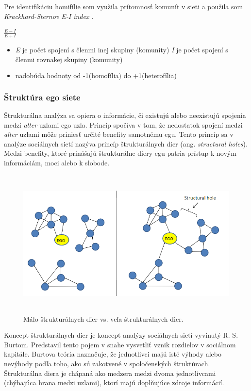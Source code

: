 \documentclass[slovak,master,public,dept460,male,cpdeclaration,oneside]{diploma}
\begin{document}
Pre identifikáciu homifílie som využila prítomnosť komunít v sieti a použila som \textit{Krackhard-Sternov E-I index}  \cite{22}.

${
\frac{E-I}{E+I}
}$

\begin{itemize}
\item \textit{E} je počet spojení s členmi inej skupiny (komunity) \textit{I} je počet spojení s členmi rovnakej skupiny (komunity)
\item nadobúda hodnoty od -1(homofília) do +1(heterofília)
\end{itemize}



\subsubsection{Štruktúra ego siete}
Štrukturálna analýza sa opiera o informácie, či existujú alebo neexistujú spojenia medzi \textit{alter} uzlami ego uzla. Princíp spočíva v tom, že nedostatok spojení medzi \textit{alter} uzlami môže priniesť určité benefity samotnému egu. Tento princíp sa v analýze sociálnych sietí nazýva princíp štrukturálnych dier (ang. \textit{structural holes}). Medzi benefity, ktoré prinášajú štrukturálne diery egu patria prístup k novým informáciám, moci alebo k slobode.


\begin{figure}[H]
\centering
\includegraphics[width=15cm, height=7.5cm]{figures/structuralholes}
\caption{Málo štrukturálnych dier vs. veľa štrukturálnych dier.}
\end{figure}


Koncept štrukturálnych dier je koncept analýzy sociálnych sietí vyvinutý R. S. Burtom. Predstavil tento pojem v snahe vysvetliť vznik rozdielov v sociálnom kapitále. Burtova teória naznačuje, že jednotlivci majú isté výhody alebo nevýhody podľa toho, ako sú zakotvené v spoločenských štruktúrach. Štrukturálna diera je chápaná ako medzera medzi dvoma jednotlivcami (chýbajúca hrana medzi uzlami), ktorí majú doplňujúce zdroje informácií. \cite{burt2004structural}
\end{document}
